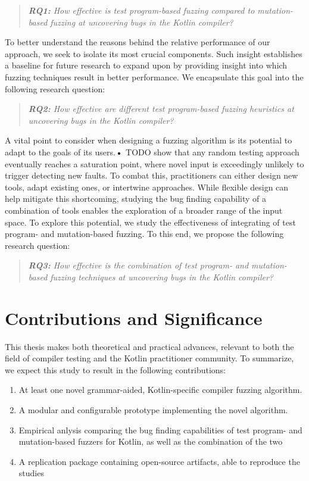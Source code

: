 \begin{quote}
\centering 
\emph{\textbf{RQ1:} How effective is test program-based
fuzzing compared to mutation-based fuzzing
at uncovering bugs in the Kotlin compiler?}
\end{quote}

To better understand the reasons behind the relative performance
of our approach, we seek to isolate its most crucial components.
Such insight establishes a baseline for future research to expand upon
by providing insight into which fuzzing techniques result in better performance.
We encapsulate this goal into the following research question:

\begin{quote}
\centering 
\emph{\textbf{RQ2:} How effective are different test program-based
fuzzing heuristics at uncovering bugs in the Kotlin compiler?}
\end{quote}

A vital point to consider when designing a fuzzing algorithm is
its potential to adapt to the goals of its users.\textbf{•}
TODO show that any random testing approach eventually reaches a
saturation point, where novel input is exceedingly unlikely to trigger
detecting new faults. 
To combat this, practitioners can either design new tools, adapt existing
ones, or intertwine approaches.
While flexible design can help mitigate this shortcoming, studying the 
bug finding capability of a combination of tools enables
the exploration of a broader range of the input space.
To explore this potential, we study the effectiveness of 
integrating of test program- and mutation-based fuzzing.
To this end, we propose the following research question:

\begin{quote}
\centering 
\emph{\textbf{RQ3:} How effective is the combination of 
test program- and mutation-based fuzzing techniques at uncovering
bugs in the Kotlin compiler?}
\end{quote}

\section{Contributions and Significance}

This thesis makes both theoretical and practical advances,
relevant to both the field of compiler testing and the 
Kotlin practitioner community. To summarize, we expect this
study to result in the following contributions:

\begin{enumerate}
	\item At least one novel grammar-aided, Kotlin-specific compiler fuzzing algorithm.
	\item A modular and configurable prototype implementing the novel algorithm.
	\item Empirical anlysis comparing the bug finding capabilities of test program- and mutation-based fuzzers for Kotlin, as well as the combination of the two
	\item A replication package containing open-source artifacts, able to reproduce the studies
\end{enumerate}

